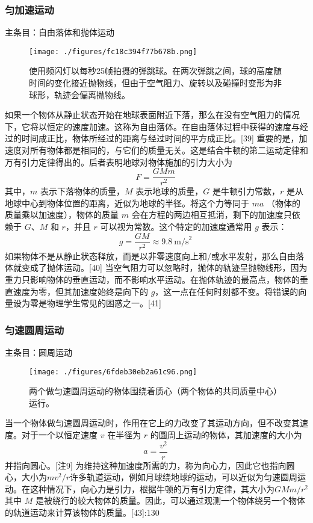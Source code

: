 \subsubsection{匀加速运动} 
主条目：自由落体和抛体运动
\begin{figure}[ht]
\centering
\texttt{[image: ./figures/fc18c394f77b678b.png]}
\caption{使用频闪灯以每秒25帧拍摄的弹跳球。在两次弹跳之间，球的高度随时间的变化接近抛物线，但由于空气阻力、旋转以及碰撞时变形为非球形，轨迹会偏离抛物线。} \label{fig_NEW01_4}
\end{figure}
如果一个物体从静止状态开始在地球表面附近下落，那么在没有空气阻力的情况下，它将以恒定的速度加速。这称为自由落体。在自由落体过程中获得的速度与经过的时间成正比，物体所经过的距离与经过时间的平方成正比。[39] 重要的是，加速度对所有物体都是相同的，与它们的质量无关。这是结合牛顿的第二运动定律和万有引力定律得出的。后者表明地球对物体施加的引力大小为
\[
F = \frac{GMm}{r^2}~
\]
其中，\( m \) 表示下落物体的质量，\( M \) 表示地球的质量，\( G \) 是牛顿引力常数，\( r \) 是从地球中心到物体位置的距离，近似为地球的半径。将这个力等同于 \( ma \) （物体的质量乘以加速度），物体的质量 \( m \) 会在方程的两边相互抵消，剩下的加速度只依赖于 \( G \)、\( M \) 和 \( r \)，并且 \( r \) 可以视为常数。这个特定的加速度通常用 \( g \) 表示：
\[
g = \frac{GM}{r^2} \approx 9.8~\text{m/s}^2~
\]
如果物体不是从静止状态释放，而是以非零速度向上和/或水平发射，那么自由落体就变成了抛体运动。[40] 当空气阻力可以忽略时，抛体的轨迹呈抛物线形，因为重力只影响物体的垂直运动，而不影响水平运动。在抛体轨迹的最高点，物体的垂直速度为零，但其加速度始终是向下的 \( g \)，这一点在任何时刻都不变。将错误的向量设为零是物理学生常见的困惑之一。[41]
\subsubsection{匀速圆周运动} 
主条目：圆周运动
\begin{figure}[ht]
\centering
\texttt{[image: ./figures/6fdeb30eb2a61c96.png]}
\caption{两个做匀速圆周运动的物体围绕着质心（两个物体的共同质量中心）运行。} \label{fig_NEW01_5}
\end{figure}
当一个物体做匀速圆周运动时，作用在它上的力改变了其运动方向，但不改变其速度。对于一个以恒定速度 \( v \) 在半径为 \( r \) 的圆周上运动的物体，其加速度的大小为
\[
a = \frac{v^2}{r}~
\]
并指向圆心。[注9] 为维持这种加速度所需的力，称为向心力，因此它也指向圆心，大小为\(mv^2/r\)许多轨道运动，例如月球绕地球的运动，可以近似为匀速圆周运动。在这种情况下，向心力是引力，根据牛顿的万有引力定律，其大小为\(GMm/r^2\)其中 \( M \) 是被绕行的较大物体的质量。因此，可以通过观测一个物体绕另一个物体的轨道运动来计算该物体的质量。[43]:130

